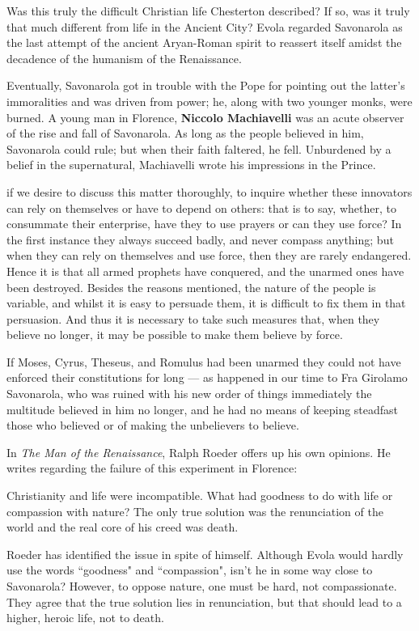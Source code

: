 Was this truly the difficult Christian life Chesterton described? If so, was it truly that much different from life in the Ancient City? Evola regarded Savonarola as the last attempt of the ancient Aryan-Roman spirit to reassert itself amidst the decadence of the humanism of the Renaissance.

Eventually, Savonarola got in trouble with the Pope for pointing out the latter's immoralities and was driven from power; he, along with two younger monks, were burned. A young man in Florence, \textbf{Niccolo Machiavelli} was an acute observer of the rise and fall of Savonarola. As long as the people believed in him, Savonarola could rule; but when their faith faltered, he fell. Unburdened by a belief in the supernatural, Machiavelli wrote his impressions in the Prince.

\begin{quotex}
if we desire to discuss this matter thoroughly, to inquire whether these innovators can rely on themselves or have to depend on others: that is to say, whether, to consummate their enterprise, have they to use prayers or can they use force? In the first instance they always succeed badly, and never compass anything; but when they can rely on themselves and use force, then they are rarely endangered. Hence it is that all armed prophets have conquered, and the unarmed ones have been destroyed. Besides the reasons mentioned, the nature of the people is variable, and whilst it is easy to persuade them, it is difficult to fix them in that persuasion. And thus it is necessary to take such measures that, when they believe no longer, it may be possible to make them believe by force.

If Moses, Cyrus, Theseus, and Romulus had been unarmed they could not have enforced their constitutions for long — as happened in our time to Fra Girolamo Savonarola, who was ruined with his new order of things immediately the multitude believed in him no longer, and he had no means of keeping steadfast those who believed or of making the unbelievers to believe.

\end{quotex}
In \textit{The Man of the Renaissance}, Ralph Roeder offers up his own opinions. He writes regarding the failure of this experiment in Florence:

\begin{quotex}
Christianity and life were incompatible. What had goodness to do with life or compassion with nature? The only true solution was the renunciation of the world and the real core of his creed was death.

\end{quotex}
Roeder has identified the issue in spite of himself. Although Evola would hardly use the words ``goodness" and ``compassion", isn't he in some way close to Savonarola? However, to oppose nature, one must be hard, not compassionate. They agree that the true solution lies in renunciation, but that should lead to a higher, heroic life, not to death.

